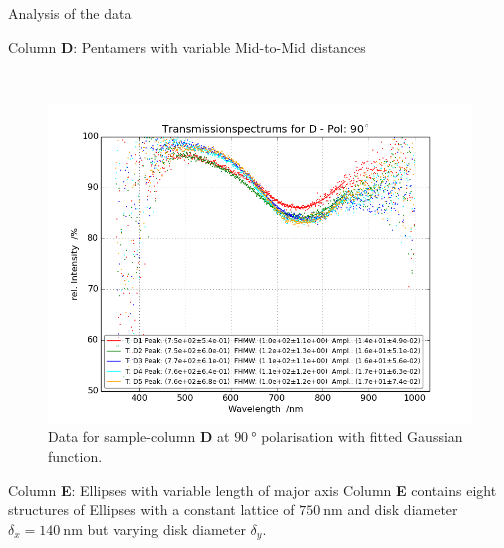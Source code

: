 \documentclass[pdftex, a4paper,11pt, twoside, UKenglish]{report}
\begin{document}
\begin{chapter}{Analysis of the data}
\begin{section}{Column \textbf{D}: Pentamers with variable Mid-to-Mid
        distances}
\begin{figure}[ht!]
\begin{minipage}{.95\textwidth}
          \label{fig:TransspecFIT_DPol0}
        \end{minipage}\\
        \begin{minipage}{.95\textwidth}
          \centering
          \includegraphics[width=\textwidth]
              {Figures/TransspecFIT_DPol90.png}
          \caption{Data for sample-column \textbf{D} at $\SI{90}{\degree}$
              polarisation with fitted Gaussian function.}
          \label{fig:TransspecFIT_DPol90}
        \end{minipage}
      \end{figure}
      
    \end{section}
    
    
    
    \newpage
    \begin{section}{Column \textbf{E}: Ellipses with variable length of
        major axis}
      \label{chp:DataE}
      Column \textbf{E} contains eight structures of Ellipses with a constant
      lattice of $\SI{750}{\nano\meter}$ and disk diameter
      $\delta_{x} = \SI{140}{\nano\meter}$ but varying disk diameter
      $\delta_{y}$.
      
      

\end{section}
\end{chapter}
\end{document}
